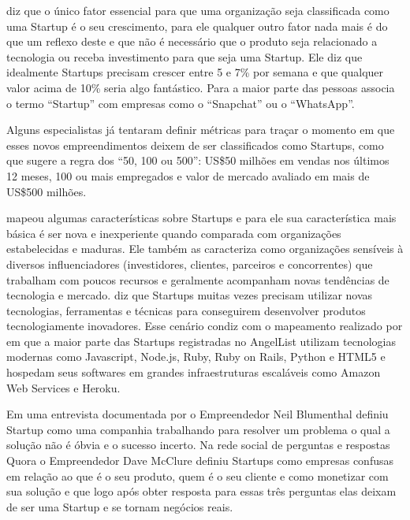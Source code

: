  diz que o único fator essencial para que uma organização seja classificada como uma Startup é o seu crescimento, para ele qualquer outro fator nada mais é do que um reflexo deste e que não é necessário que o produto seja relacionado a tecnologia ou receba investimento para que seja uma Startup. Ele diz que idealmente Startups precisam crescer entre 5 e 7\% por semana e que qualquer valor acima de 10\% seria algo fantástico. Para  a maior parte das pessoas associa o termo ``Startup'' com empresas como o ``Snapchat'' ou o ``WhatsApp''.

Alguns especialistas já tentaram definir métricas para traçar o momento em que esses novos empreendimentos deixem de ser classificados como Startups, como  que sugere a regra dos ``50, 100 ou 500'': US\$50 milhões em vendas nos últimos 12 meses, 100 ou mais empregados e valor de mercado avaliado em mais de US\$500 milhões.   

 mapeou algumas características sobre Startups e para ele sua característica mais básica é ser nova e inexperiente quando comparada com organizações estabelecidas e maduras. Ele também as caracteriza como organizações sensíveis à diversos influenciadores (investidores, clientes, parceiros e concorrentes) que trabalham com poucos recursos e geralmente acompanham novas tendências de tecnologia e mercado.  diz que Startups muitas vezes precisam utilizar novas tecnologias, ferramentas e técnicas para conseguirem desenvolver produtos tecnologiamente inovadores. Esse cenário condiz com o mapeamento realizado por  em que a maior parte das Startups registradas no AngelList utilizam tecnologias modernas como Javascript, Node.js, Ruby, Ruby on Rails, Python e HTML5 e hospedam seus softwares em grandes infraestruturas escaláveis como Amazon Web Services e Heroku.

Em uma entrevista documentada por  o Empreendedor Neil Blumenthal definiu Startup como uma companhia trabalhando para resolver um problema o qual a solução não é óbvia e o sucesso incerto. Na rede social de perguntas e respostas Quora o Empreendedor Dave McClure definiu Startups como empresas confusas em relação ao que é o seu produto, quem é o seu cliente e como monetizar com sua solução e que logo após obter resposta para essas três perguntas elas deixam de ser uma Startup e se tornam negócios reais.

